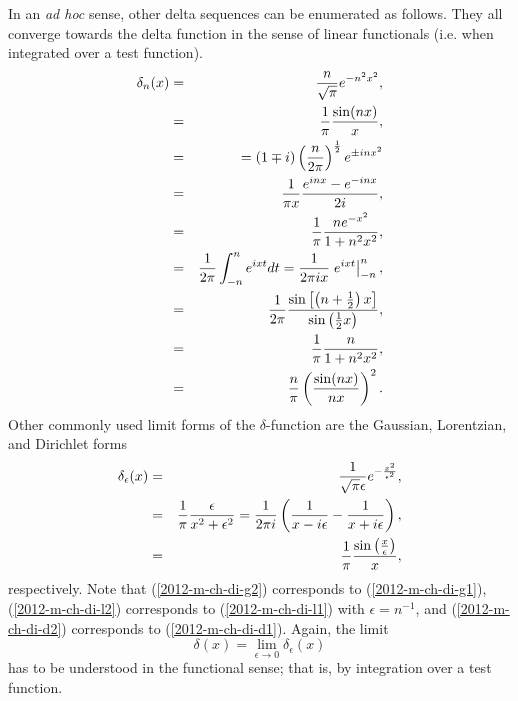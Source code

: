 In an {\it ad hoc} sense, other delta sequences can be enumerated as follows.
They all converge towards the delta function in the sense of linear functionals (i.e. when integrated over a test function).
\begin{eqnarray}
\delta_n(x)
&=& \frac{n}{\sqrt{\pi}} e^{-n^2 x^2},
\label{2012-m-ch-di-g1}\\
&=&
\frac{1}{\pi}   \frac{\sin (n x)}{ x}, \label{2012-m-ch-di-d1}\\
&=&
= (1\mp i)\left( {n\over 2\pi }\right)^{1\over 2} e^{\pm inx^2}  \\
&=&
\frac{1}{\pi x}  \frac{e^{inx}-e^{-inx}}{2i} ,\\
&=&
\frac{1}{\pi}  \frac{n  e^{-x^2}}{1+n^2x^2} ,\\
&=&
\frac{1}{2\pi } \int_{-n}^n e^{ixt} dt  = \frac{1}{2\pi i x} \left. e^{ixt}\right|_{-n}^n    ,\\
&=&
\frac{1}{2\pi} \frac{\sin \left[\left( n+\frac{1}{2}\right) x \right]  }{\sin \left( \frac{1}{2}x \right)   },\\
&=&
\frac{1}{\pi}\frac{n}{1+ n^2x^2},    \label{2012-m-ch-di-l1} \\
&=&
\frac{n}{ \pi}\left(\frac{\sin (nx)}{nx}\right)^2.
\end{eqnarray}
Other commonly used limit forms of the $\delta $-function are the Gaussian, Lorentzian, and Dirichlet forms
\begin{eqnarray}
\delta_\epsilon (x) &=&   \frac{1}{\sqrt{\pi } \epsilon } e^{-\frac{x^2}{\epsilon^2}} ,
\label{2012-m-ch-di-g2} \\
&=&  \frac{1}{\pi} \frac{\epsilon }{x^2+\epsilon^2}
=   {1\over 2\pi i}
\left(
{1 \over x-i\epsilon }
-
{1 \over x+i\epsilon }
 \right)
 , \label{2012-m-ch-di-l2}  \\
&=&  \frac{1}{\pi } \frac{\sin \left(\frac{x}{\epsilon }\right)}{x} ,  \label{2012-m-ch-di-d2}
\end{eqnarray}
respectively.
Note that
(\ref{2012-m-ch-di-g2}) corresponds to (\ref{2012-m-ch-di-g1}),
(\ref{2012-m-ch-di-l2}) corresponds to (\ref{2012-m-ch-di-l1}) with $\epsilon=n^{-1}$,
and
(\ref{2012-m-ch-di-d2}) corresponds to (\ref{2012-m-ch-di-d1}).
Again, the limit
\begin{equation}
\delta (x)= \lim_{\epsilon \rightarrow 0} \delta_\epsilon (x)
\end{equation}
has to be understood in the functional sense; that is, by integration over a test function.

